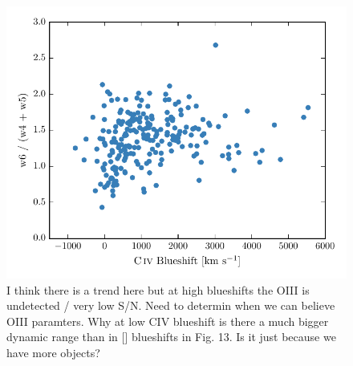 \begin{figure}
    \centering
    \includegraphics[width=\columnwidth]{figures/chapter04/civ_blueshift_oiii_blueshift_components.pdf} 
    \caption{I think there is a trend here but at high blueshifts the OIII is undetected / very low S/N. Need to determin when we can believe OIII paramters. Why at low CIV blueshift is there a much bigger dynamic range than in [] blueshifts in Fig. 13. Is it just because we have more objects?}     
    \label{fig:civ_blueshift_oiii_blueshift_components}
\end{figure}

